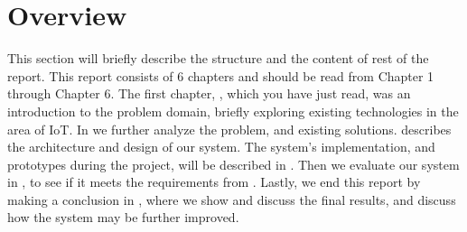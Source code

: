 \section{Overview}\label{sec:overview}
This section will briefly describe the structure and the content of rest of the report. 
This report consists of 6 chapters and should be read from Chapter 1 through Chapter 6. 
The first chapter, , which you have just read, 
was an introduction to the problem domain, 
briefly exploring existing technologies in the area of IoT. 
In  we further analyze the problem, 
and existing solutions.
 describes the architecture and design of our system. 
The system's implementation, and prototypes during the project, 
will be described in .
Then we evaluate our system in , 
to see if it meets the requirements from .
Lastly, we end this report by making a conclusion in , 
where we show and discuss the final results, 
and discuss how the system may be further improved. 
